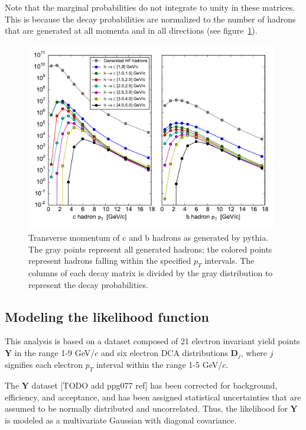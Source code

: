 \documentclass[12pt]{article}
\newcommand{\pt}{p_T}
\newcommand{\eptdata}{\mathbf{Y}}
\newcommand{\dcadata}{\mathbf{D}_j}
\begin{document}
Note that the marginal probabilities do not integrate to unity in these matrices. This is because the decay probabilities are normalized to the number of hadrons that are generated at all momenta and in all directions (see figure~\ref{fig:gen}).
\begin{figure}[htb]
  \begin{center}
    \includegraphics[width=0.98\textwidth]{hpt-gen}
  \end{center}
  \caption{Transverse momentum of c and b hadrons as generated by pythia. The gray points represent all generated hadrons; the colored points represent hadrons falling within the specified $\pt$ intervals. The columns of each decay matrix is divided by the gray distribution to represent the decay probabilities.}
  \label{fig:gen}
\end{figure}


\subsection{Modeling the likelihood function}
This analysis is based on a dataset composed of 21 electron invariant yield points $\eptdata$ in the range 1-9 GeV/$c$ and six electron DCA distributions $\dcadata$, where $j$ signifies each electron $\pt$ interval within the range 1-5 GeV/$c$.

The $\eptdata$ dataset [TODO add ppg077 ref] has been corrected for background, efficiency, and acceptance, and has been assigned statistical uncertainties that are assumed to be normally distributed and uncorrelated. Thus, the likelihood for $\eptdata$ is modeled as a multivariate Gaussian with diagonal covariance.
\end{document}
